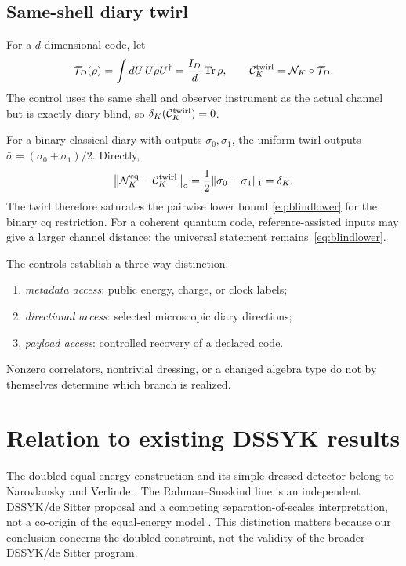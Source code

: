 \documentclass[11pt]{article}
\newcommand{\cC}{\mathcal C}
\newcommand{\cN}{\mathcal N}
\newcommand{\cT}{\mathcal T}
\newcommand{\Tr}{\operatorname{Tr}}
\begin{document}
\subsection{Same-shell diary twirl}

For a $d$-dimensional code, let
\begin{equation}
  \cT_D(\rho)=\int dU\,U\rho U^\dagger
  =\frac{I_D}{d}\Tr\rho,
  \qquad
  \cC_K^{\rm twirl}=\cN_K\circ\cT_D.
  \label{eq:twirl}
\end{equation}
The control uses the same shell and observer instrument as the actual channel
but is exactly diary blind, so $\delta_K(\cC_K^{\rm twirl})=0$.

For a binary classical diary with outputs $\sigma_0,\sigma_1$, the uniform
twirl outputs $\bar\sigma=(\sigma_0+\sigma_1)/2$.  Directly,
\begin{equation}
  \left\|\cN_K^{\rm cq}-\cC_K^{\rm twirl}\right\|_\diamond
  =\frac12\|\sigma_0-\sigma_1\|_1
  =\delta_K.
  \label{eq:twirlidentity}
\end{equation}
The twirl therefore saturates the pairwise lower bound
\eqref{eq:blindlower} for the binary cq restriction.  For a coherent quantum
code, reference-assisted inputs may give a larger channel distance; the
universal statement remains~\eqref{eq:blindlower}.

The controls establish a three-way distinction:
\begin{enumerate}[label=(\roman*)]
  \item \emph{metadata access}: public energy, charge, or clock labels;
  \item \emph{directional access}: selected microscopic diary directions;
  \item \emph{payload access}: controlled recovery of a declared code.
\end{enumerate}
Nonzero correlators, nontrivial dressing, or a changed algebra type do not by
themselves determine which branch is realized.

\section{Relation to existing DSSYK results}
\label{sec:literature}

The doubled equal-energy construction and its simple dressed detector belong
to Narovlansky and Verlinde \citep{NarovlanskyVerlinde2023}.  The
Rahman--Susskind line is an independent DSSYK/de Sitter proposal and a
competing separation-of-scales interpretation, not a co-origin of the
equal-energy model
\citep{SusskindSeparation,RahmanDSJT,RahmanSusskindComments}.  This distinction matters
because our conclusion concerns the doubled constraint, not the validity of
the broader DSSYK/de Sitter program.
\end{document}
